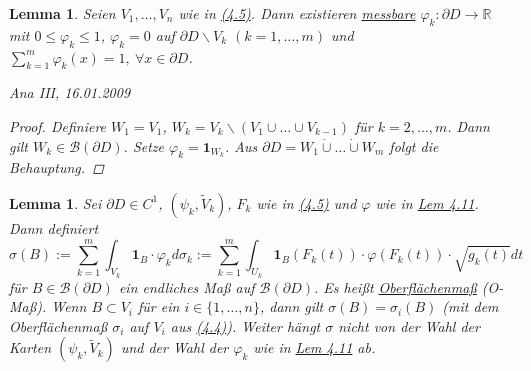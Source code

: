 \documentclass[a4paper]{report}
\newcommand{\doubleOne}{\textbf{1}}
\newcommand{\R}{\mathbb{R}}
\newcommand{\Borel}{\mathcal{B}}
\newcommand{\dcup}{\dot{\cup}}
\newcommand{\jlabel}[1]{\label{j_#1}}
\newcommand{\jhyperref}[2]{\hyperref[j_#1]{#2}}
\newcommand{\jlink}[1]{\jhyperref{#1}{#1}}
\newcommand{\jabb}[3]{ #1: #2 \rightarrow #3 }
\newcommand{\jspacesmall}{\vspace{4pt}}
\newcommand{\jdate}[1]{\jspacesmall\begin{center}\jlabel{#1}\tiny{Ana III, #1}\end{center}}
\theoremstyle{plain}
\newtheorem{lem}[thm]{Lemma}
\theoremstyle{definition}
\begin{document}
{{{{\begin{lem}
    \jlabel{Lem 4.11}
    Seien $V_1,\dots,V_n$ wie in \jlink{(4.5)}. Dann existieren \jhyperref{messbar}{messbare} $\jabb{\varphi_k}{\partial D}{\R}$ mit $0 \le \varphi_k \le 1$, $\varphi_k = 0$ auf $\partial D\backslash V_k$ $(k=1,\dots,m)$ und $\sum_{k=1}^m \varphi_k(x) = 1, \ \forall x \in \partial D$.
    
\jdate{16.01.2009}
    
    \begin{proof}
        Definiere $W_1 = V_1$, $W_k = V_k\backslash (V_1 \cup \dots \cup V_{k-1})$ für $k=2,\dots,m$. Dann gilt $W_k \in \Borel(\partial D)$. Setze $\varphi_k = \doubleOne_{W_k}$. Aus $\partial D = W_1 \dcup \dots \dcup W_m$ folgt die Behauptung.
    \end{proof}
\end{lem}

\begin{lem}
    \jlabel{Lem 4.12}
    Sei $\partial D \in C^1$, $(\psi_k, \tilde{V}_k)$, $F_k$ wie in \jlink{(4.5)} und $\varphi$ wie in \jlink{Lem 4.11}. Dann definiert
    \[
        \sigma(B) := \sum_{k=1}^m \int_{V_k} \doubleOne_B \cdot \varphi_k d\sigma_k := \sum_{k=1}^m \int_{U_k} \doubleOne_B(F_k(t))\cdot \varphi(F_k(t)) \cdot \sqrt{g_k(t)} dt
    \]
    für $B\in \Borel(\partial D)$ ein endliches Maß auf $\Borel(\partial D)$. Es heißt \uline{Oberflächenmaß} (O-Maß). Wenn $B\subset V_i$ für ein $i\in \{1,\dots,n\}$, dann gilt $\sigma(B) = \sigma_i(B)$ (mit dem Oberflächenmaß $\sigma_i$ auf $V_i$ aus \jlink{(4.4)}). Weiter hängt $\sigma$ nicht von der Wahl der Karten $(\psi_k, \tilde{V}_k)$ und der Wahl der $\varphi_k$ wie in \jlink{Lem 4.11} ab.
    

\end{lem}}}}}
\end{document}
